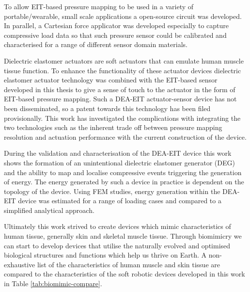 To allow EIT-based pressure mapping to be used in a variety of portable/wearable, small scale applications a open-source circuit was developed. In parallel, a Cartesian force applicator was developed especially to capture compressive load data so that such pressure sensor could be calibrated and characterised for a range of different sensor domain materials.

Dielectric elastomer actuators are soft actuators that can emulate human muscle tissue function. To enhance the functionality of these actuator devices dielectric elastomer actuator technology was combined with the EIT-based sensor developed in this thesis to give a sense of touch to the actuator in the form of EIT-based pressure mapping. Such a DEA-EIT actuator-sensor device has not been disseminated, so a patent towards this technology has been filed provisionally. This work has investigated the complications with integrating the two technologies such as the inherent trade off between pressure mapping resolution and actuation performance with the current construction of the device.

During the validation and characterisation of the DEA-EIT device this work shows the formation of an unintentional dielectric elastomer generator (DEG) and the ability to map and localise compressive events triggering the generation of energy. The energy generated by such a device in practice is dependent on the topology of the device. Using FEM studies, energy generation within the DEA-EIT device was estimated for a range of loading cases and compared to a simplified analytical approach.

Ultimately this work strived to create devices which mimic characteristics of human tissue, generally skin and skeletal muscle tissue. Through biomimicry we can start to develop devices that utilise the naturally evolved and optimised biological structures and functions which help us thrive on Earth. A non-exhaustive list of the characteristics of human muscle and skin tissue are compared to the characteristics of the soft robotic devices developed in this work in Table \ref{tab:biomimic-compare}.

